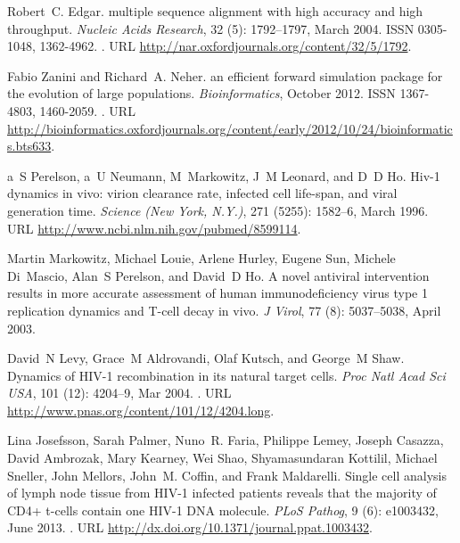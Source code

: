 \documentclass[11pt]{article}
\begin{document}
\begin{thebibliography}{48}
Robert~C. Edgar.
 multiple sequence alignment with high accuracy and high
  throughput.
\newblock \emph{Nucleic Acids Research}, 32 (5): 1792--1797,
  March 2004.
\newblock ISSN 0305-1048, 1362-4962.
\newblock {}.
\newblock URL \url{http://nar.oxfordjournals.org/content/32/5/1792}.

Fabio Zanini and Richard~A. Neher.
 an efficient forward simulation package for the evolution
  of large populations.
\newblock \emph{Bioinformatics}, October 2012.
\newblock ISSN 1367-4803, 1460-2059.
\newblock {}.
\newblock URL
  \url{http://bioinformatics.oxfordjournals.org/content/early/2012/10/24/bioinformatics.bts633}.

a~S Perelson, a~U Neumann, M~Markowitz, J~M Leonard, and D~D Ho.
\newblock Hiv-1 dynamics in vivo: virion clearance rate, infected cell
  life-span, and viral generation time.
\newblock \emph{Science {(New York, N.Y.)}}, 271 (5255):
  1582--6, March 1996.
\newblock URL \url{http://www.ncbi.nlm.nih.gov/pubmed/8599114}.

Martin Markowitz, Michael Louie, Arlene Hurley, Eugene Sun, Michele Di~Mascio,
  Alan~S Perelson, and David~D Ho.
\newblock A novel antiviral intervention results in more accurate assessment of
  human immunodeficiency virus type 1 replication dynamics and {T-cell} decay
  in vivo.
\newblock \emph{J Virol}, 77 (8): 5037--5038, April 2003.

David~N Levy, Grace~M Aldrovandi, Olaf Kutsch, and George~M Shaw.
\newblock Dynamics of {HIV}-1 recombination in its natural target cells.
\newblock \emph{Proc Natl Acad Sci USA}, 101 (12): 4204--9,
  Mar 2004.
\newblock {}.
\newblock URL \url{http://www.pnas.org/content/101/12/4204.long}.

Lina Josefsson, Sarah Palmer, Nuno~R. Faria, Philippe Lemey, Joseph Casazza,
  David Ambrozak, Mary Kearney, Wei Shao, Shyamasundaran Kottilil, Michael
  Sneller, John Mellors, John~M. Coffin, and Frank Maldarelli.
\newblock Single cell analysis of lymph node tissue from {HIV-1} infected
  patients reveals that the majority of {CD4+} t-cells contain one {HIV-1}
  {DNA} molecule.
\newblock \emph{{PLoS} Pathog}, 9 (6): e1003432, June 2013.
\newblock {}.
\newblock URL \url{http://dx.doi.org/10.1371/journal.ppat.1003432}.


\end{thebibliography}
\end{document}
